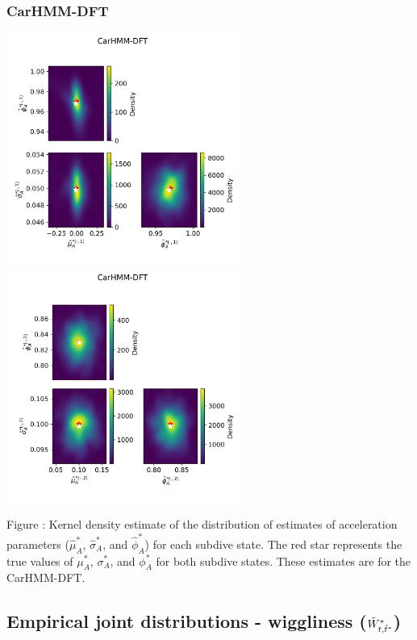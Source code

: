\documentclass{article}
\begin{document}
        \subsubsection{CarHMM-DFT}
        \begin{center}
        \includegraphics[width=3in]{../Plots/hmm_FV_MLE_density_A_0_0.png}
        \includegraphics[width=3in]{../Plots/hmm_FV_MLE_density_A_0_1.png}
        \end{center}
        
        \noindent Figure : Kernel density estimate of the distribution of estimates of acceleration parameters ($\hat \mu^*_A$, $\hat \sigma^*_A$, and $\hat \phi^*_A$) for each subdive state. The red star represents the true values of $\mu^*_A$, $\sigma^*_A$, and $\phi^*_A$ for both subdive states. These estimates are for the CarHMM-DFT.
        \addtocounter{fignum}{1}
        
    \newpage
    \subsection{Empirical joint distributions - wiggliness ($\tilde{W}^*_{t,\tilde t^*}$)}
    
\end{document}
